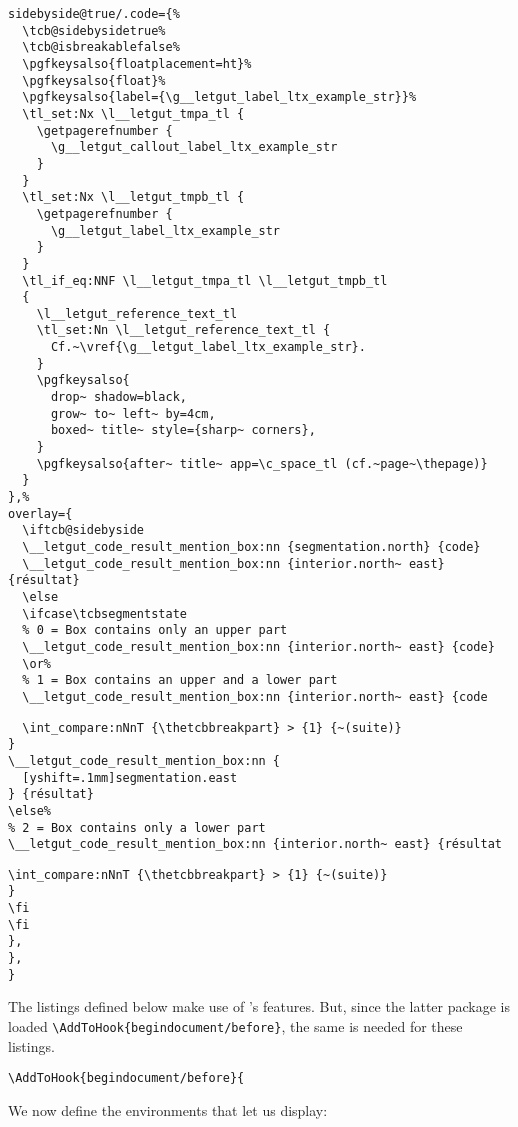 \documentclass{letgut}
\begin{document}
\begin{lstlisting}
sidebyside@true/.code={%
  \tcb@sidebysidetrue%
  \tcb@isbreakablefalse%
  \pgfkeysalso{floatplacement=ht}%
  \pgfkeysalso{float}%
  \pgfkeysalso{label={\g__letgut_label_ltx_example_str}}%
  \tl_set:Nx \l__letgut_tmpa_tl {
    \getpagerefnumber {
      \g__letgut_callout_label_ltx_example_str
    }
  }
  \tl_set:Nx \l__letgut_tmpb_tl {
    \getpagerefnumber {
      \g__letgut_label_ltx_example_str
    }
  }
  \tl_if_eq:NNF \l__letgut_tmpa_tl \l__letgut_tmpb_tl
  {
    \l__letgut_reference_text_tl
    \tl_set:Nn \l__letgut_reference_text_tl {
      Cf.~\vref{\g__letgut_label_ltx_example_str}.
    }
    \pgfkeysalso{
      drop~ shadow=black,
      grow~ to~ left~ by=4cm,
      boxed~ title~ style={sharp~ corners},
    }
    \pgfkeysalso{after~ title~ app=\c_space_tl (cf.~page~\thepage)}
  }
},%
overlay={
  \iftcb@sidebyside
  \__letgut_code_result_mention_box:nn {segmentation.north} {code}
  \__letgut_code_result_mention_box:nn {interior.north~ east} {résultat}
  \else
  \ifcase\tcbsegmentstate
  % 0 = Box contains only an upper part
  \__letgut_code_result_mention_box:nn {interior.north~ east} {code}
  \or%
  % 1 = Box contains an upper and a lower part
  \__letgut_code_result_mention_box:nn {interior.north~ east} {code
\end{lstlisting}

\begin{lstlisting}
  \int_compare:nNnT {\thetcbbreakpart} > {1} {~(suite)}
}
\__letgut_code_result_mention_box:nn {
  [yshift=.1mm]segmentation.east
} {résultat}
\else%
% 2 = Box contains only a lower part
\__letgut_code_result_mention_box:nn {interior.north~ east} {résultat
\end{lstlisting}

\begin{lstlisting}
\int_compare:nNnT {\thetcbbreakpart} > {1} {~(suite)}
}
\fi
\fi
},
},
}
\end{lstlisting}

The  listings defined below make use of
's features. But, since the latter package is loaded
\lstinline+\AddToHook{begindocument/before}+, the same is needed for these listings.

\begin{lstlisting}
\AddToHook{begindocument/before}{
\end{lstlisting}

We now define the environments that let us display:
\end{document}
